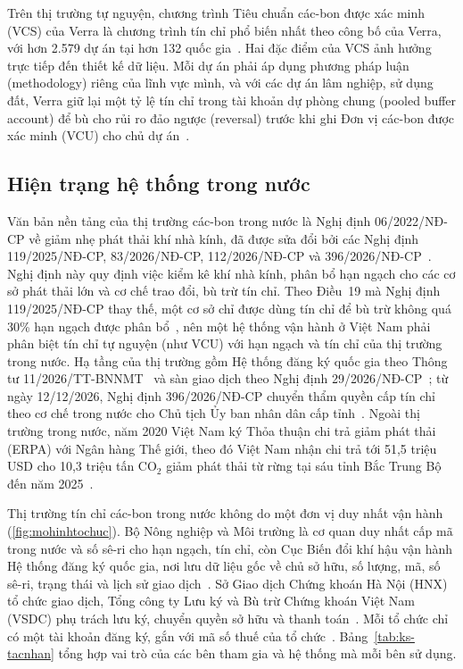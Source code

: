 \HinhMRV

Trên thị trường tự nguyện, chương trình Tiêu chuẩn các-bon được xác minh (VCS) của Verra là chương trình tín chỉ phổ biến nhất theo công bố của Verra, với hơn 2.579 dự án tại hơn 132 quốc gia~\cite{verra2024vcs}. Hai đặc điểm của VCS ảnh hưởng trực tiếp đến thiết kế dữ liệu. Mỗi dự án phải áp dụng phương pháp luận (methodology) riêng của lĩnh vực mình, và với các dự án lâm nghiệp, sử dụng đất, Verra giữ lại một tỷ lệ tín chỉ trong tài khoản dự phòng chung (pooled buffer account) để bù cho rủi ro đảo ngược (reversal) trước khi ghi Đơn vị các-bon được xác minh (VCU) cho chủ dự án~\cite{verra2024vcs,verra2024projecthub}.

\FloatBarrier
\subsection*{Hiện trạng hệ thống trong nước}
\label{subsec:ks-tongquan}
\label{subsec:ks-hientrang}

Văn bản nền tảng của thị trường các-bon trong nước là Nghị định 06/2022/NĐ-CP về giảm nhẹ phát thải khí nhà kính, đã được sửa đổi bởi các Nghị định 119/2025/NĐ-CP, 83/2026/NĐ-CP, 112/2026/NĐ-CP và 396/2026/NĐ-CP~\cite{vietnam2022nghidinh06}. Nghị định này quy định việc kiểm kê khí nhà kính, phân bổ hạn ngạch cho các cơ sở phát thải lớn và cơ chế trao đổi, bù trừ tín chỉ. Theo Điều~19 mà Nghị định 119/2025/NĐ-CP thay thế, một cơ sở chỉ được dùng tín chỉ để bù trừ không quá 30\% hạn ngạch được phân bổ~\cite{vietnam2025nghidinh119}, nên một hệ thống vận hành ở Việt Nam phải phân biệt tín chỉ tự nguyện (như VCU) với hạn ngạch và tín chỉ của thị trường trong nước. Hạ tầng của thị trường gồm Hệ thống đăng ký quốc gia theo Thông tư 11/2026/TT-BNNMT~\cite{vietnam2026thongtu11} và sàn giao dịch theo Nghị định 29/2026/NĐ-CP~\cite{vietnam2026nghidinh29}; từ ngày 12/12/2026, Nghị định 396/2026/NĐ-CP chuyển thẩm quyền cấp tín chỉ theo cơ chế trong nước cho Chủ tịch Ủy ban nhân dân cấp tỉnh~\cite{vietnam2026nghidinh396}. Ngoài thị trường trong nước, năm 2020 Việt Nam ký Thỏa thuận chi trả giảm phát thải (ERPA) với Ngân hàng Thế giới, theo đó Việt Nam nhận chi trả tới 51,5 triệu USD cho 10,3 triệu tấn CO$_2$ giảm phát thải từ rừng tại sáu tỉnh Bắc Trung Bộ đến năm 2025~\cite{worldbank2020erpa}.

Thị trường tín chỉ các-bon trong nước không do một đơn vị duy nhất vận hành (\autoref{fig:mohinhtochuc}). Bộ Nông nghiệp và Môi trường là cơ quan duy nhất cấp mã trong nước và số sê-ri cho hạn ngạch, tín chỉ, còn Cục Biến đổi khí hậu vận hành Hệ thống đăng ký quốc gia, nơi lưu dữ liệu gốc về chủ sở hữu, số lượng, mã, số sê-ri, trạng thái và lịch sử giao dịch~\cite{vietnam2026thongtu11}. Sở Giao dịch Chứng khoán Hà Nội (HNX) tổ chức giao dịch, Tổng công ty Lưu ký và Bù trừ Chứng khoán Việt Nam (VSDC) phụ trách lưu ký, chuyển quyền sở hữu và thanh toán~\cite{vietnam2026nghidinh29}. Mỗi tổ chức chỉ có một tài khoản đăng ký, gắn với mã số thuế của tổ chức~\cite{vietnam2026thongtu11}. Bảng~\ref{tab:ks-tacnhan} tổng hợp vai trò của các bên tham gia và hệ thống mà mỗi bên sử dụng.

